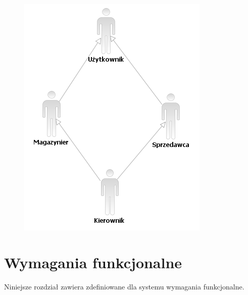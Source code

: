 \begin{figure}[h]
    \begin{center}
    \includegraphics[scale=0.75]{../img/diagramDziedziczenia.png}
    \end{center}
    \label{fig:diagramDziedziczenia}
\end{figure}
\FloatBarrier



\section{Wymagania funkcjonalne}

Niniejsze rozdział zawiera zdefiniowane dla systemu wymagania funkcjonalne.


